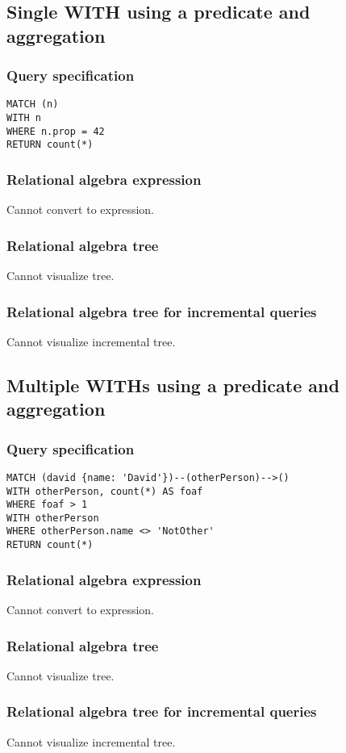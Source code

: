 \subsection{Single WITH using a predicate and aggregation}

\subsubsection*{Query specification}

\begin{lstlisting}
MATCH (n)
WITH n
WHERE n.prop = 42
RETURN count(*)
\end{lstlisting}

\subsubsection*{Relational algebra expression}

Cannot convert to expression.

\subsubsection*{Relational algebra tree}

Cannot visualize tree.

\subsubsection*{Relational algebra tree for incremental queries}

Cannot visualize incremental tree.

\subsection{Multiple WITHs using a predicate and aggregation}

\subsubsection*{Query specification}

\begin{lstlisting}
MATCH (david {name: 'David'})--(otherPerson)-->()
WITH otherPerson, count(*) AS foaf
WHERE foaf > 1
WITH otherPerson
WHERE otherPerson.name <> 'NotOther'
RETURN count(*)
\end{lstlisting}

\subsubsection*{Relational algebra expression}

Cannot convert to expression.

\subsubsection*{Relational algebra tree}

Cannot visualize tree.

\subsubsection*{Relational algebra tree for incremental queries}

Cannot visualize incremental tree.

